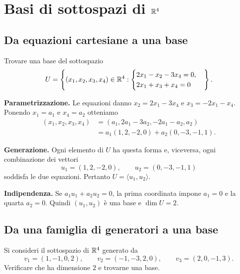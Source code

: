 \section{Basi di sottospazi di \texorpdfstring{$\mathbb{R}^4$}{R4}}

\subsection{Da equazioni cartesiane a una base}

\begin{esercizio}
Trovare una base del sottospazio
\[
  U=\left\{(x_1,x_2,x_3,x_4)\in\mathbb{R}^4:
  \begin{cases}
    2x_1-x_2-3x_4=0,\\
    2x_1+x_3+x_4=0
  \end{cases}\right\}.
\]
\end{esercizio}

\begin{svolgimento}
\textbf{Parametrizzazione.} Le equazioni danno $x_2=2x_1-3x_4$ e $x_3=-2x_1-x_4$. Ponendo $x_1=a_1$ e $x_4=a_2$ otteniamo
\begin{align*}
  (x_1,x_2,x_3,x_4)
  &=(a_1,2a_1-3a_2,-2a_1-a_2,a_2)\\
  &=a_1(1,2,-2,0)+a_2(0,-3,-1,1).
\end{align*}

\textbf{Generazione.} Ogni elemento di $U$ ha questa forma e, viceversa, ogni combinazione dei vettori
\[
  u_1=(1,2,-2,0),\qquad u_2=(0,-3,-1,1)
\]
soddisfa le due equazioni. Pertanto $U=\langle u_1,u_2\rangle$.

\textbf{Indipendenza.} Se $a_1u_1+a_2u_2=0$, la prima coordinata impone $a_1=0$ e la quarta $a_2=0$. Quindi $(u_1,u_2)$ è una base e $\dim U=2$.
\end{svolgimento}

\subsection{Da una famiglia di generatori a una base}

\begin{esercizio}
Si consideri il sottospazio di $\mathbb{R}^4$ generato da
\[
  v_1=(1,-1,0,2),\qquad v_2=(-1,-3,2,0),\qquad v_3=(2,0,-1,3).
\]
Verificare che ha dimensione $2$ e trovarne una base.
\end{esercizio}

